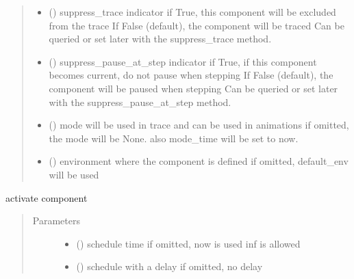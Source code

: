 \documentclass[letterpaper,10pt,english]{sphinxmanual}
\begin{document}
\begin{fulllineitems}
\begin{quote}
\begin{description}
\begin{itemize}
\item {} 
 () \textendash{} suppress\_trace indicator 
if True, this component will be excluded from the trace 
If False (default), the component will be traced 
Can be queried or set later with the suppress\_trace method.

\item {} 
 () \textendash{} suppress\_pause\_at\_step indicator 
if True, if this component becomes current, do not pause when stepping 
If False (default), the component will be paused when stepping 
Can be queried or set later with the suppress\_pause\_at\_step method.

\item {} 
 () \textendash{} mode 
will be used in trace and can be used in animations 
if omitted, the mode will be None. 
also mode\_time will be set to now.

\item {} 
 ({\hyperref[\detokenize{Reference:salabim.Environment}]{}}) \textendash{} environment where the component is defined 
if omitted, default\_env will be used

\end{itemize}

\end{description}\end{quote}

\begin{fulllineitems}
\label{\detokenize{Reference:salabim.Component.activate}}
activate component
\begin{quote}\begin{description}
\item[{Parameters}] \leavevmode\begin{itemize}
\item {} 
 () \textendash{} schedule time 
if omitted, now is used 
inf is allowed

\item {} 
 () \textendash{} schedule with a delay 
if omitted, no delay


\end{itemize}
\end{description}
\end{quote}
\end{fulllineitems}
\end{fulllineitems}
\end{document}
